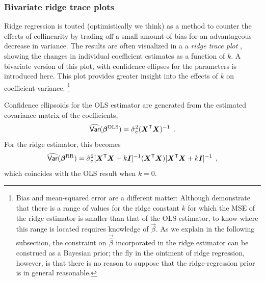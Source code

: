 \subsubsection{Bivariate ridge trace plots}\label{sec:ridge2}

Ridge regression is touted (optimistically we think) as a method to counter the effects
of collinearity by trading off a small amount of bias for an
advantageous decrease in variance.  The results are often
visualized in a a \emph{ridge trace plot}
\citep{HoerlKennard:1970b},
showing the changes
in individual coefficient estimates as a function of $k$.
A bivariate version of this plot, with confidence ellipses for
the parameters is introduced here.  This plot provides greater
insight into the effects of $k$ on coefficient variance.
\footnote{Bias and mean-squared error are a different matter: Although \citet{HoerlKennard:1970a} demonstrate that there is a range of values for the ridge constant $k$ for which the MSE of the ridge estimator is smaller than that of the OLS estimator, to know where this range is located requires knowledge of $\vec{\beta}$. As we explain in the following subsection, the constraint on $\vec{\hat{\beta}}$ incorporated in the ridge estimator can be construed as a Bayesian prior; the fly in the ointment of ridge regression, however, is that there is no reason to suppose that the ridge-regression prior is in general reasonable.}

Confidence ellipsoids for the OLS estimator are generated
from the estimated covariance matrix of the coefficients,
\begin{equation*}
\widehat{\mathsf{Var}} (\bm{\beta}^{\mathrm{OLS}}) = \hat{\sigma}^2_e (\bm{X}^\mathsf{T} \bm{X})^{-1} \:\: .
\end{equation*}
For the ridge estimator, this becomes
\citep{Marquardt:1970}
\begin{equation}
\widehat{\mathsf{Var}} (\bm{\beta}^{\mathrm{RR}}) = \hat{\sigma}^2_e
    [\bm{X}^\mathsf{T} \bm{X} + k \bm{I}]^{-1}
    (\bm{X}^\mathsf{T} \bm{X})
    [\bm{X}^\mathsf{T} \bm{X} + k \bm{I}]^{-1} \:\: ,
\end{equation}
which coincides with the OLS result when $k=0$.
	
